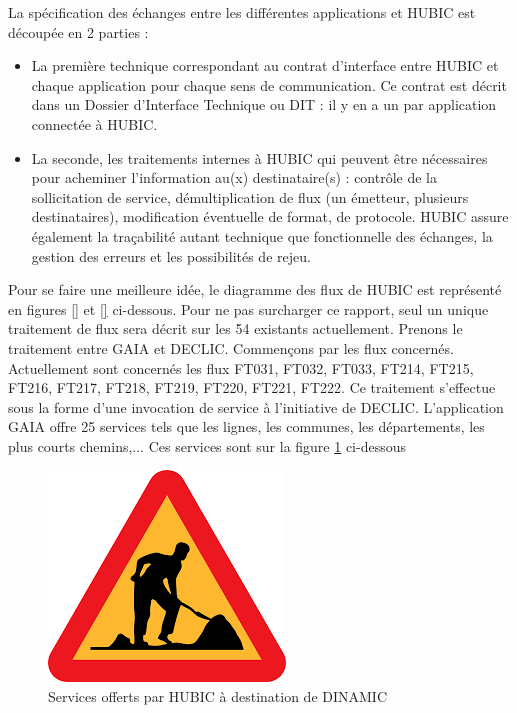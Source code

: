La spécification des échanges entre les différentes applications et HUBIC est découpée en 2
parties :
\begin{itemize}
\item La première technique correspondant au contrat d'interface entre HUBIC et chaque application
pour chaque sens de communication. Ce contrat est décrit dans un Dossier
d'Interface Technique ou DIT : il y en a un par application connectée à HUBIC.
\item La seconde, les traitements internes à HUBIC qui peuvent être nécessaires pour acheminer
l'information au(x) destinataire(s) : contrôle de la sollicitation de service, démultiplication
de flux (un émetteur, plusieurs destinataires), modification éventuelle de format, de
protocole. HUBIC assure également la traçabilité autant technique que fonctionnelle des
échanges, la gestion des erreurs et les possibilités de rejeu.
\end{itemize}
Pour se faire une meilleure idée, le diagramme des flux de HUBIC est représenté en figures \ref{} et \ref{} ci-dessous. Pour ne pas surcharger ce rapport, seul un unique traitement de flux sera décrit
sur les 54 existants actuellement. Prenons le traitement entre GAIA et DECLIC.
Commençons par les flux concernés. Actuellement sont concernés les flux FT031, FT032, FT033,
FT214, FT215, FT216, FT217, FT218, FT219, FT220, FT221, FT222.
Ce traitement s'effectue sous la forme d'une invocation de service à l'initiative de DECLIC.
L'application GAIA offre 25 services tels que les lignes, les communes, les départements, les
plus courts chemins,... Ces services sont sur la figure \ref{services} ci-dessous
\begin{figure}[h!]
	\centering
	\includegraphics[width=0.7\linewidth]{img/encours}
	\caption{Services offerts par HUBIC à destination de DINAMIC}
	\label{services}
\end{figure}

